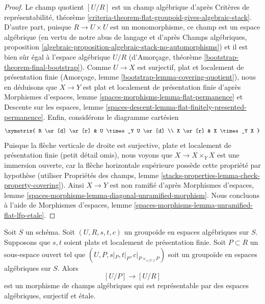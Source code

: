 \begin{proof}
Le champ quotient $[U/R]$ est un champ alg\'ebrique d'apr\`es
Crit\`eres de repr\'esentabilit\'e, th\'eor\`eme
\ref{criteria-theorem-flat-groupoid-gives-algebraic-stack}.
D'autre part, puisque $R \to U \times U$ est un monomorphisme,
ce champ est un espace alg\'ebrique (en vertu de notre abus de langage et d'apr\`es
Champs alg\'ebriques, proposition
\ref{algebraic-proposition-algebraic-stack-no-automorphisms})
et il est bien s\^ur \'egal \`a l'espace alg\'ebrique $U/R$
(d'Amor\c{c}age, th\'eor\`eme \ref{bootstrap-theorem-final-bootstrap}).
Comme $U \to X$ est surjectif, plat et localement de pr\'esentation finie
(Amor\c{c}age, lemme \ref{bootstrap-lemma-covering-quotient}),
nous en d\'eduisons que $X \to Y$ est plat et localement de pr\'esentation finie d'apr\`es
Morphismes d'espaces, lemme \ref{spaces-morphisms-lemma-flat-permanence}
et
Descente sur les espaces, lemme
\ref{spaces-descent-lemma-flat-finitely-presented-permanence}.
Enfin, consid\'erons le diagramme cart\'esien
$$
\xymatrix{
R \ar[d] \ar[r] & U \times_Y U \ar[d] \\
X \ar[r] & X \times_Y X
}
$$
Puisque la fl\`eche verticale de droite est surjective, plate et
localement de pr\'esentation finie (petit d\'etail omis), nous
voyons que $X \to X \times_Y X$ est une immersion ouverte, car la fl\`eche
horizontale sup\'erieure poss\`ede cette propri\'et\'e par hypoth\`ese (utiliser
Propri\'et\'es des champs, lemme
\ref{stacks-properties-lemma-check-property-covering}).
Ainsi $X \to Y$ est non ramifi\'e d'apr\`es
Morphismes d'espaces, lemme
\ref{spaces-morphisms-lemma-diagonal-unramified-morphism}.
Nous concluons \`a l'aide de
Morphismes d'espaces, lemme
\ref{spaces-morphisms-lemma-unramified-flat-lfp-etale}.
\end{proof}

\begin{lemma}
\label{lemma-quasi-splitting-etale}
Soit $S$ un sch\'ema.
Soit $(U, R, s, t, c)$ un groupo\"ide en espaces alg\'ebriques sur $S$.
Supposons que $s, t$ soient plats et localement de pr\'esentation finie.
Soit $P \subset R$ un sous-espace ouvert tel que
$(U, P, s|_P, t|_P, c|_{P \times_{s, U, t} P})$ soit un
groupo\"ide en espaces alg\'ebriques sur $S$. Alors
$$
[U/P] \longrightarrow [U/R]
$$
est un morphisme de champs alg\'ebriques qui
est repr\'esentable par des espaces alg\'ebriques, surjectif et \'etale.
\end{lemma}


